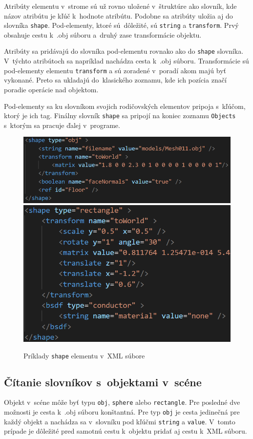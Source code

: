Atribúty elementu v~strome sú už rovno uložené v~štruktúre ako slovník, kde názov atribútu je kľúč k~hodnote atribútu. Podobne sa atribúty uložia aj do slovníka \verb|shape|. Pod-elementy, ktoré sú~dôležité, sú \verb|string| a \verb|transform|. Prvý obsahuje cestu k~.obj súboru a~druhý zase transformácie objektu.

Atribúty sa pridávajú do slovníka pod-elementu rovnako ako do \verb|shape| slovníka. V~týchto atribútoch sa napríklad nachádza cesta k~.obj súboru. Transformácie sú pod-elementy elementu \verb|transform| a sú zoradené v~poradí akom majú byť vykonané. Preto sa ukladajú do~klasického zoznamu, kde ich pozícia značí poradie operácie nad objektom.

Pod-elementy sa ku slovníkom svojich rodičovských elementov pripoja s~kľúčom, ktorý je ich tag. Finálny slovník \verb|shape| sa pripojí na koniec zoznamu \verb|Objects| s~ktorým sa pracuje ďalej v~programe.

\begin{figure}[t!] \label{XMLShape}
    \centering
    \includegraphics[width=0.58\linewidth]{obrazky-figures/XMLShape.png}
    \includegraphics[width=0.40\linewidth]{obrazky-figures/XMLShape2.png}
    \caption{Príklady \texttt{shape} elementu v~XML súbore}
\end{figure}

\subsection*{Čítanie slovníkov s~objektami v~scéne}
Objekt v~scéne môže byť typu \verb|obj|, \verb|sphere| alebo \verb|rectangle|. Pre posledné dve možnosti je cesta k~.obj súboru konštantná. Pre typ \verb|obj| je cesta jedinečná pre každý objekt a nachádza sa v~slovníku pod kľúčmi \verb|string| a \verb|value|. V~tomto prípade je dôležité pred samotnú cestu k~objektu pridať aj cestu k~XML súboru.


